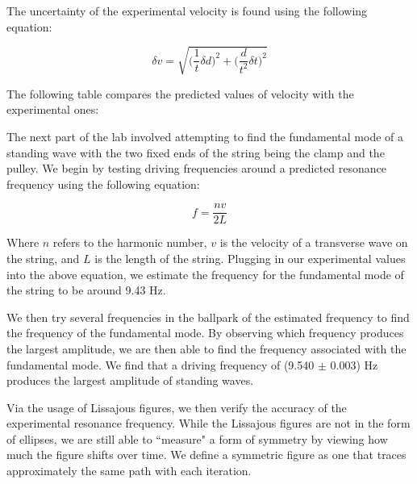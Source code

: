 \documentclass[twoside,twocolumn]{article}
\begin{document}
\noindent The uncertainty of the experimental velocity is found using the following equation:

\footnotesize
\begin{equation}
\delta v = \sqrt{\bigg ( \frac{1}{t}\delta d \bigg )^2 + \bigg ( \frac{d}{t^2} \delta t \bigg)^2}
\end{equation}
\normalsize

\noindent The following table compares the predicted values of velocity with the experimental ones:

\begin{table}[!htbp]
\caption{Wave Speed Comparison}
\centering
{}
\end{table}

\noindent The next part of the lab involved attempting to find the fundamental mode of a standing wave with the two fixed ends of the string being the clamp and the pulley. We begin by testing driving frequencies around a predicted resonance frequency using the following equation:

\footnotesize
\begin{equation}
f = \frac{nv}{2L}
\end{equation}
\normalsize

\noindent Where $n$ refers to the harmonic number, $v$ is the velocity of a transverse wave on the string, and $L$ is the length of the string. Plugging in our experimental values into the above equation, we estimate the frequency for the fundamental mode of the string to be around 9.43 Hz.

\noindent We then try several frequencies in the ballpark of the estimated frequency to find the frequency of the fundamental mode. By observing which frequency produces the largest amplitude, we are then able to find the frequency associated with the fundamental mode. We find that a driving frequency of (9.540 $\pm$ 0.003) Hz produces the largest amplitude of standing waves.

\noindent Via the usage of Lissajous figures, we then verify the accuracy of the experimental resonance frequency. While the Lissajous figures are not in the form of ellipses, we are still able to ``measure" a form of symmetry by viewing how much the figure shifts over time. We define a symmetric figure as one that traces approximately the same path with each iteration.
\end{document}
